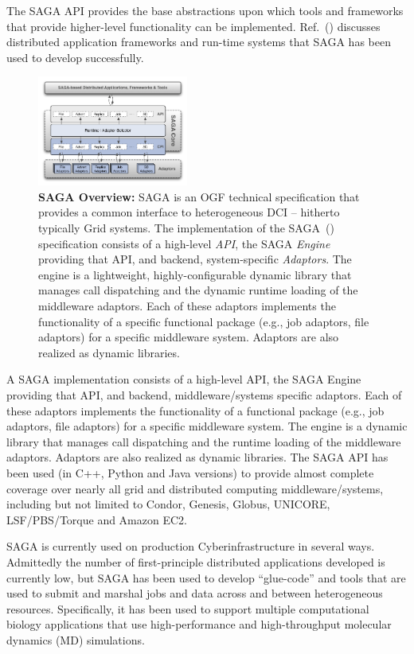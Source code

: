 \documentclass{sig-alternate}
\begin{document}
The SAGA API provides the base abstractions upon which tools and
frameworks that provide higher-level functionality can be
implemented. Ref.~(\cite{saga_url}) discusses distributed application
frameworks and run-time systems that SAGA has been used to develop
successfully. 

\begin{figure}[t]
\centering
\includegraphics[width=0.44\textwidth]{./figs/saga-architecture-1}
\caption{\textbf{SAGA Overview: } SAGA is an OGF technical
  specification that provides a common interface to heterogeneous DCI
  -- hitherto typically Grid systems.  The implementation of the
  SAGA~(\cite{saga_url}) specification consists of a high-level {\it
    API}, the SAGA {\it Engine} providing that API, and backend,
  system-specific {\it Adaptors}.  The engine is a lightweight,
  highly-configurable dynamic library that manages call dispatching
  and the dynamic runtime loading of the middleware adaptors.  Each of
  these adaptors implements the functionality of a specific functional
  package (e.g., job adaptors, file adaptors) for a specific
  middleware system. Adaptors are also realized as dynamic libraries.}
 \label{fig:saga-overview}
\end{figure}

A SAGA implementation consists of a high-level API, the SAGA
Engine providing that API, and backend, middleware/systems specific
adaptors. Each of these adaptors implements the functionality of
a functional package (e.g., job adaptors, file adaptors) for a
specific middleware system. The engine is a dynamic library that
manages call dispatching and the runtime loading of the middleware
adaptors. Adaptors are also realized as dynamic libraries. The SAGA
API has been used (in C++, Python and Java versions) to provide almost
complete coverage over nearly all grid and distributed computing
middleware/systems, including but not limited to Condor, Genesis,
Globus, UNICORE, LSF/PBS/Torque and Amazon EC2.

SAGA is currently used on production Cyberinfrastructure in several
ways. Admittedly the number of first-principle distributed
applications developed is currently low, but SAGA has been used to develop
``glue-code'' and tools that are used to submit and marshal jobs and
data across and between heterogeneous resources. Specifically, it has
been used to support multiple computational biology applications that
use high-performance and high-throughput molecular dynamics (MD)
simulations.
\end{document}
